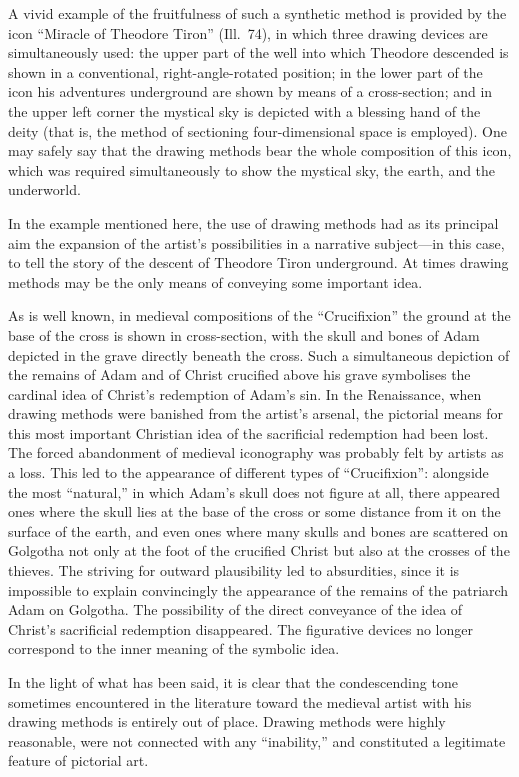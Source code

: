 
A vivid example of the fruitfulness of such a synthetic method is provided by the icon
``Miracle of Theodore Tiron'' (Ill.~74), in which three drawing devices are simultaneously
used: the upper part of the well into which Theodore descended is shown in a conventional,
right-angle-rotated position; in the lower part of the icon his adventures underground
are shown by means of a cross-section; and in the upper left corner the mystical sky is
depicted with a blessing hand of the deity (that is, the method of sectioning
four-dimensional space is employed).  One may safely say that the drawing methods bear
the whole composition of this icon, which was required simultaneously to show the mystical
sky, the earth, and the underworld.


In the example mentioned here, the use of drawing methods had as its principal aim the
expansion of the artist's possibilities in a narrative subject---in this case, to tell
the story of the descent of Theodore Tiron underground.  At times drawing methods may be
the only means of conveying some important idea.

As is well known, in medieval compositions of the ``Crucifixion'' the ground at the base
of the cross is shown in cross-section, with the skull and bones of Adam depicted in the
grave directly beneath the cross.  Such a simultaneous depiction of the remains of Adam
and of Christ crucified above his grave symbolises the cardinal idea of Christ's
redemption of Adam's sin.  In the Renaissance, when drawing methods were banished from
the artist's arsenal, the pictorial means for this most important Christian idea of the
sacrificial redemption had been lost.  The forced abandonment of medieval iconography was
probably felt by artists as a loss.  This led to the appearance of different types of
``Crucifixion'': alongside the most ``natural,'' in which Adam's skull does not figure at
all, there appeared ones where the skull lies at the base of the cross or some distance
from it on the surface of the earth, and even ones where many skulls and bones are
scattered on Golgotha not only at the foot of the crucified Christ but also at the crosses
of the thieves.  The striving for outward plausibility led to absurdities, since it is
impossible to explain convincingly the appearance of the remains of the patriarch Adam on
Golgotha.  The possibility of the direct conveyance of the idea of Christ's sacrificial
redemption disappeared.  The figurative devices no longer correspond to the inner meaning
of the symbolic idea.


In the light of what has been said, it is clear that the condescending tone sometimes
encountered in the literature toward the medieval artist with his drawing methods is
entirely out of place.  Drawing methods were highly reasonable, were not connected with
any ``inability,'' and constituted a legitimate feature of pictorial art.
